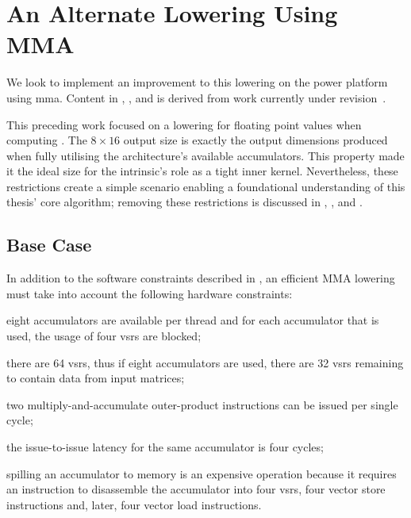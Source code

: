 \documentclass[\main/thesis.tex]{subfiles}
\begin{document}
\section{An Alternate Lowering Using MMA}
\label{sec:alternateLowering}
We look to implement an improvement to this lowering on the \gls{power} platform using \gls{mma}.
Content in , , and  is derived from work currently under revision~\autocite{kuzma2021fast}.

This preceding work focused on a lowering for floating point values when computing .
The $8 \times 16$ output size is exactly the output dimensions produced when fully utilising the architecture's available accumulators.
This property made it the ideal size for the intrinsic's role as a tight inner kernel.
Nevertheless, these restrictions create a simple scenario enabling a foundational understanding of this thesis' core algorithm; removing these restrictions is discussed in , , and .

\subsection{Base Case}
\label{sec:baseCase}
In addition to the software constraints described in , an efficient MMA lowering must take into account the following hardware constraints:
\begin{enumerate*}[itemjoin*={{ and }}, label=\fbox{\arabic*}]
  \item eight accumulators are available per thread and for each accumulator that is used, the usage of four \glspl{vsr} are blocked;
  \item there are 64 \glspl{vsr}, thus if eight accumulators are used, there are 32 \glspl{vsr} remaining to contain data from input matrices;
  \item two multiply-and-accumulate outer-product instructions can be issued per single cycle;
  \item the issue-to-issue latency for the same accumulator is four cycles;
  \item spilling an accumulator to memory is an expensive operation because it requires an instruction to disassemble the accumulator into four \glspl{vsr}, four vector store instructions and, later, four vector load instructions.
\end{enumerate*}
\end{document}
